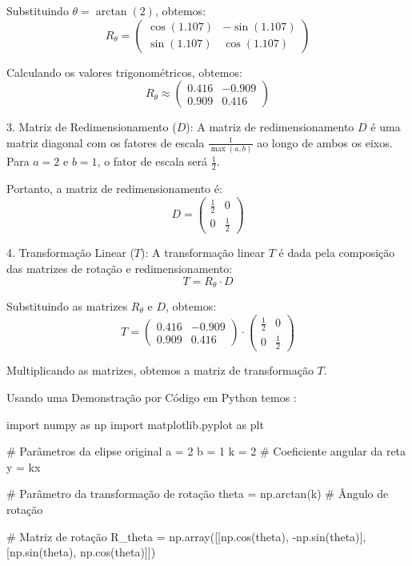    Substituindo \( \theta = \arctan(2) \), obtemos:
   \[
   R_{\theta} = \begin{pmatrix} \cos(1.107) & -\sin(1.107) \\ \sin(1.107) & \cos(1.107) \end{pmatrix}
   \]

   Calculando os valores trigonométricos, obtemos:
   \[
   R_{\theta} \approx \begin{pmatrix} 0.416 & -0.909 \\ 0.909 & 0.416 \end{pmatrix}
   \]

3. Matriz de Redimensionamento (\( D \)):
   A matriz de redimensionamento \( D \) é uma matriz diagonal com os fatores de escala \( \frac{1}{\max(a, b)} \) ao longo de ambos os eixos. Para \( a = 2 \) e \( b = 1 \), o fator de escala será \( \frac{1}{2} \).

   Portanto, a matriz de redimensionamento é:
   \[
   D = \begin{pmatrix} \frac{1}{2} & 0 \\ 0 & \frac{1}{2} \end{pmatrix}
   \]

4. Transformação Linear (\( T \)):
   A transformação linear \( T \) é dada pela composição das matrizes de rotação e redimensionamento:
   \[
   T = R_{\theta} \cdot D
   \]

   Substituindo as matrizes \( R_{\theta} \) e \( D \), obtemos:
   \[
   T = \begin{pmatrix} 0.416 & -0.909 \\ 0.909 & 0.416 \end{pmatrix} \cdot \begin{pmatrix} \frac{1}{2} & 0 \\ 0 & \frac{1}{2} \end{pmatrix}
   \]

   Multiplicando as matrizes, obtemos a matriz de transformação \( T \).


Usando uma Demonstração por Código em Python temos :

import numpy as np
import matplotlib.pyplot as plt

# Parâmetros da elipse original
a = 2
b = 1
k = 2  # Coeficiente angular da reta y = kx

# Parâmetro da transformação de rotação
theta = np.arctan(k)  # Ângulo de rotação

# Matriz de rotação
R_theta = np.array([[np.cos(theta), -np.sin(theta)],
                    [np.sin(theta), np.cos(theta)]])

